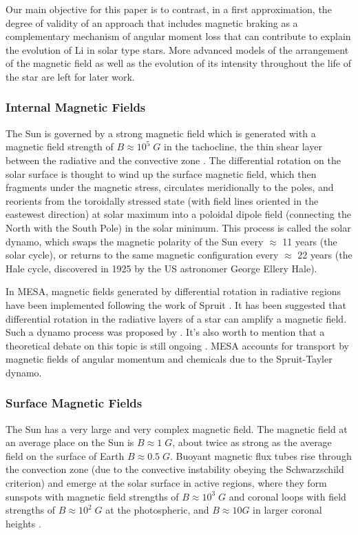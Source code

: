 \documentclass[fleqn,usenatbib]{mnras}
\begin{document}
Our main objective for this paper is to contrast, in a first approximation, the degree of validity of an approach that includes magnetic braking as a complementary mechanism of angular moment loss that can contribute to explain the evolution of Li in solar type stars. More advanced models of the arrangement of the magnetic field as well as the evolution of its intensity throughout the life of the star are left for later work.\par

\subsubsection{Internal Magnetic Fields}
The Sun is governed by a strong magnetic field which is generated with a magnetic field strength of $B\approx10^5\; G$ in the tachocline, the thin shear layer between the radiative and the convective zone \citep{Aschwanden2014}. The differential rotation on the solar surface is thought to wind up the surface magnetic field, which then fragments under the magnetic stress, circulates meridionally to the poles, and reorients from the toroidally stressed state (with field lines oriented in the eastewest direction) at solar maximum into a poloidal dipole field (connecting the North with the South Pole) in the solar minimum. This process is called the solar dynamo, which swaps the magnetic polarity of the Sun every $\approx$ 11 years (the solar cycle), or returns to the same magnetic configuration every $\approx$ 22 years (the Hale cycle, discovered in 1925 by the US astronomer George Ellery Hale).\par

In MESA, magnetic fields generated by differential rotation in radiative regions have been implemented following the work of Spruit \citep{Paxton2013}. It has been suggested that differential rotation in the radiative layers of a star can amplify a magnetic field. Such a dynamo process was proposed by \citet{Spruit2002}. It's also worth to mention that a theoretical debate on this topic is still ongoing \citep{Denissenkov2007}. MESA accounts for transport by magnetic fields of angular momentum and chemicals due to the Spruit-Tayler dynamo.

\subsubsection{Surface Magnetic Fields}
The Sun has a very large and very complex magnetic field. The magnetic field at an average place on the Sun is $B\approx1\; G$, about twice as strong as the average field on the surface of Earth  $B\approx0.5\; G$. Buoyant magnetic flux tubes rise through the convection zone (due to the convective instability obeying the Schwarzschild criterion) and emerge at the solar surface in active regions, where they form sunspots with magnetic field strengths of $B\approx10^3\; G$ and coronal loops with field strengths of $B\approx10^2\; G$ at the photospheric, and $B\approx10 G$ in larger coronal heights \citep{Aschwanden2014}.\par
 
\end{document}
